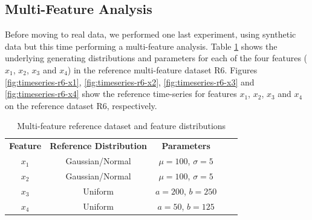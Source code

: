 \subsection{Multi-Feature Analysis}
Before moving to real data, we performed one last experiment, using synthetic data but this time performing a multi-feature analysis. Table \ref{tbl:multi-feat-ref-dataset-distros} shows the underlying generating distributions and parameters for each of the four features ($x_1$, $x_2$, $x_3$ and $x_4$) in the reference multi-feature dataset R6. Figures \ref{fig:timeseries-r6-x1}, \ref{fig:timeseries-r6-x2}, \ref{fig:timeseries-r6-x3} and \ref{fig:timeseries-r6-x4} show the reference time-series for features $x_1$, $x_2$, $x_3$ and $x_4$ on the reference dataset R6, respectively.

\begin{table}[!htb]
    \begin{center}
        \begin{tabular}{|c|c|c|ll}
        \cline{1-3}
        \textbf{Feature} & \textbf{Reference Distribution} & \textbf{Parameters} &  &  \\ \cline{1-3}
        $x_1$               & Gaussian/Normal                 & $\mu=100$, $\sigma=5$  &  &  \\ \cline{1-3}
        $x_2$               & Gaussian/Normal                 & $\mu=100$, $\sigma=5$  &  &  \\ \cline{1-3}
        $x_3$               & Uniform                         & $a=200$, $b=250$       &  &  \\ \cline{1-3}
        $x_4$               & Uniform                         & $a=50$, $b=125$        &  &  \\ \cline{1-3}
        \end{tabular}
    \end{center}
    \caption{Multi-feature reference dataset and feature distributions}
    \label{tbl:multi-feat-ref-dataset-distros}
\end{table}


